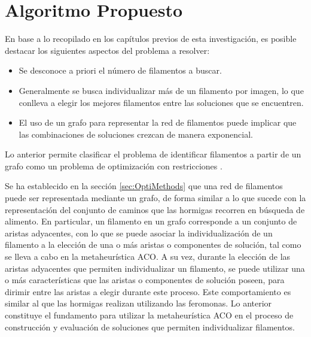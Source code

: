 \chapter{Algoritmo Propuesto}
\label{sec:modeloOpti}

En base a lo recopilado en los cap\'itulos previos de esta investigaci\'on, es posible destacar los siguientes aspectos del problema a resolver:

\begin{itemize}
    \item Se desconoce a priori el n\'umero de filamentos a buscar.%
    \item Generalmente se busca individualizar m\'as de un filamento por imagen, lo que conlleva a elegir los mejores filamentos entre las soluciones que se encuentren.
    \item El uso de un grafo para representar la red de filamentos puede implicar que las combinaciones de soluciones crezcan de manera exponencial.
\end{itemize}

Lo anterior permite clasificar el problema de identificar filamentos a partir de un grafo como un problema de optimizaci\'on con restricciones \cite{blum2011hybrid}.


Se ha establecido en la secci\'on \ref{sec:OptiMethods} que una red de filamentos puede ser representada mediante un grafo, de forma similar a lo que sucede con la representaci\'on del conjunto de caminos que las hormigas recorren en b\'usqueda de alimento. En particular, un filamento en un grafo corresponde a un conjunto de aristas adyacentes, con lo que se puede asociar la individualizaci\'on de un filamento a la elecci\'on de una o m\'as aristas o componentes de soluci\'on, tal como se lleva a cabo en la metaheur\'istica ACO. A su vez, durante la elecci\'on de las aristas adyacentes que permiten individualizar un filamento, se puede utilizar una o m\'as caracter\'isticas que las aristas o componentes de soluci\'on poseen, para dirimir entre las aristas a elegir durante este proceso. Este comportamiento es similar al que las hormigas realizan utilizando las feromonas. Lo anterior constituye el fundamento para utilizar la metaheur\'istica ACO en el proceso de construcci\'on y evaluaci\'on de soluciones que permiten individualizar filamentos.

